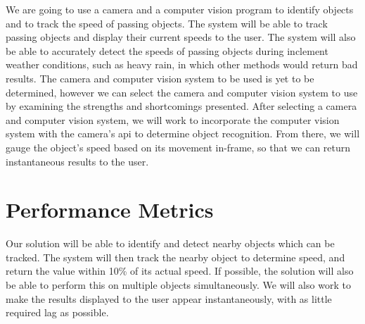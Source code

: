 \documentclass[letterpaper,10pt,onecolumn,draftclsnofoot]{IEEEtran}
\begin{document}
We are going to use a camera and a computer vision program to identify objects and to track the speed of passing objects.
 The system will be able to track passing objects and display their current speeds to the user.
 The system will also be able to accurately detect the speeds of passing objects during inclement weather conditions, such as heavy rain, in which other methods would return bad results.
 The camera and computer vision system to be used is yet to be determined, however we can select the camera and computer vision system to use by examining the strengths and shortcomings presented.
 After selecting a camera and computer vision system, we will work to incorporate the computer vision system with the camera’s api to determine object recognition.
 From there, we will gauge the object’s speed based on its movement in-frame, so that we can return instantaneous results to the user.
 

\section{Performance Metrics}

Our solution will be able to identify and detect nearby objects which can be tracked.
 The system will then track the nearby object to determine speed, and return the value within 10\% of its actual speed.
 If possible, the solution will also be able to perform this on multiple objects simultaneously.
 We will also work to make the results displayed to the user appear instantaneously, with as little required lag as possible.

 
\end{document}
